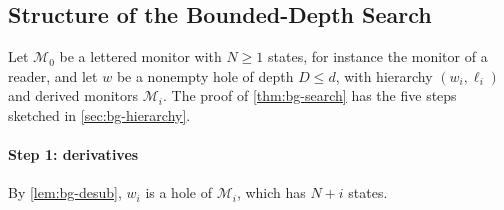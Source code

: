 \subsection{Structure of the Bounded-Depth Search}\label{app:bg-search}

Let $\mathcal M_0$ be a lettered monitor with $N\ge1$ states, for instance the
monitor of a reader, and let $w$ be a nonempty hole of depth $D\le d$, with
hierarchy $(w_i,\ell_i)$ and derived monitors $\mathcal M_i$. The proof of
\cref{thm:bg-search} has the five steps sketched in \cref{sec:bg-hierarchy}.

\paragraph{Step 1: derivatives}
By \cref{lem:bg-desub}, $w_i$ is a hole of $\mathcal M_i$, which has $N+i$
states.

